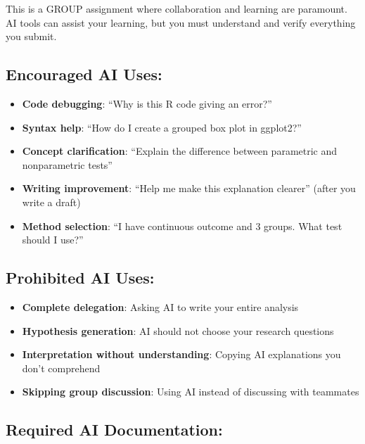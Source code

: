 \documentclass[11pt]{article}
\begin{document}
\begin{tcolorbox}[colback=aiblue!10,colframe=aiblue,title=\textbf{AI-Enhanced Learning for Group Projects}]

This is a GROUP assignment where collaboration and learning are paramount. AI tools can assist your learning, but you must understand and verify everything you submit.

\subsection*{Encouraged AI Uses:}

\begin{itemize}
\item[+] \textbf{Code debugging}: ``Why is this R code giving an error?''
\item[+] \textbf{Syntax help}: ``How do I create a grouped box plot in ggplot2?''
\item[+] \textbf{Concept clarification}: ``Explain the difference between parametric and nonparametric tests''
\item[+] \textbf{Writing improvement}: ``Help me make this explanation clearer'' (after you write a draft)
\item[+] \textbf{Method selection}: ``I have continuous outcome and 3 groups. What test should I use?''
\end{itemize}

\subsection*{Prohibited AI Uses:}

\begin{itemize}
\item[-] \textbf{Complete delegation}: Asking AI to write your entire analysis
\item[-] \textbf{Hypothesis generation}: AI should not choose your research questions
\item[-] \textbf{Interpretation without understanding}: Copying AI explanations you don't comprehend
\item[-] \textbf{Skipping group discussion}: Using AI instead of discussing with teammates
\end{itemize}

\subsection*{Required AI Documentation:}


\end{tcolorbox}
\end{document}
